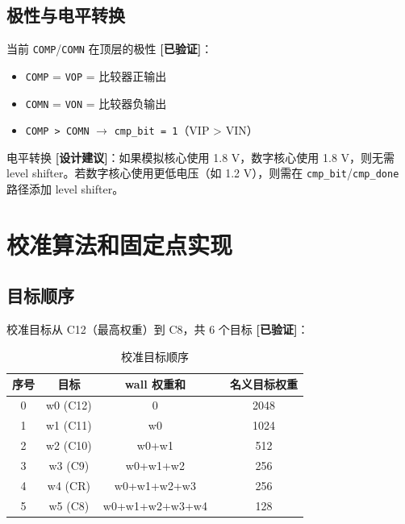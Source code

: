 \documentclass[UTF8,a4paper,11pt]{ctexart}
\newcommand{\verified}{\textcolor{verifiedgreen}{\textbf{[已验证]}}}
\newcommand{\suggested}{\textcolor{suggestblue}{\textbf{[设计建议]}}}
\begin{document}
\subsection{极性与电平转换}

当前 \texttt{COMP}/\texttt{COMN} 在顶层的极性 \verified：
\begin{itemize}[leftmargin=2em]
\item \texttt{COMP} = \texttt{VOP} = 比较器正输出
\item \texttt{COMN} = \texttt{VON} = 比较器负输出
\item \texttt{COMP > COMN} $\rightarrow$ \texttt{cmp\_bit = 1}（VIP > VIN）
\end{itemize}

电平转换 \suggested：如果模拟核心使用 1.8 V，数字核心使用 1.8 V，则无需 level shifter。若数字核心使用更低电压（如 1.2 V），则需在 \texttt{cmp\_bit}/\texttt{cmp\_done} 路径添加 level shifter。

\section{校准算法和固定点实现}

\subsection{目标顺序}

校准目标从 C12（最高权重）到 C8，共 6 个目标 \verified：

\begin{table}[H]
\centering
\caption{校准目标顺序}
\label{tab:cal-target-order}
\begin{tabular}{cccp{3cm}c}
\toprule
序号 & 目标 & wall 权重和 & & 名义目标权重 \\
\midrule
0 & w0 (C12) & 0                   & & 2048 \\
1 & w1 (C11) & w0                  & & 1024 \\
2 & w2 (C10) & w0+w1               & & 512  \\
3 & w3 (C9)  & w0+w1+w2            & & 256  \\
4 & w4 (CR)  & w0+w1+w2+w3         & & 256  \\
5 & w5 (C8)  & w0+w1+w2+w3+w4      & & 128  \\
\bottomrule
\end{tabular}
\end{table}
\end{document}
